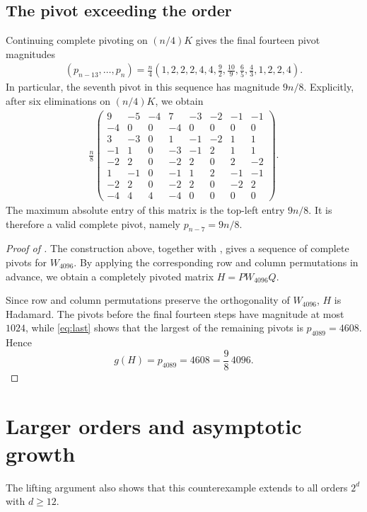 \documentclass{article}
\begin{document}
\subsection{The pivot exceeding the order}\label{sec:large-pivot}
Continuing complete pivoting on $(n/4)K$ gives the final fourteen pivot magnitudes
\begin{align}\label{eq:last}
    (p_{n-13},\ldots,p_n)
    =\frac n4\left(1,2,2,2,4,4,\frac92,\frac{10}{9},
        \frac65,\frac43,1,2,2,4\right).
\end{align}
In particular, the seventh pivot in this sequence has magnitude $9n/8$.
Explicitly, after six
eliminations on $(n/4)K$, we obtain
\begin{align*}
\frac n8
\begin{pmatrix}
 9&-5&-4&7&-3&-2&-1&-1\\
 -4&0&0&-4&0&0&0&0\\
 3&-3&0&1&-1&-2&1&1\\
 -1&1&0&-3&-1&2&1&1\\
 -2&2&0&-2&2&0&2&-2\\
 1&-1&0&-1&1&2&-1&-1\\
 -2&2&0&-2&2&0&-2&2\\
 -4&4&4&-4&0&0&0&0
\end{pmatrix}.
\end{align*}
The maximum absolute entry of this matrix is the top-left entry $9n/8$.
It is therefore a valid complete pivot, namely $p_{n-7}=9n/8$.

\begin{proof}[Proof of ]
The construction above, together with , gives
a sequence of complete pivots for $W_{4096}$.
By applying the corresponding row and column permutations in advance, we obtain a completely pivoted matrix
$H=PW_{4096}Q$.

Since row and column permutations preserve the orthogonality of $W_{4096}$, $H$ is Hadamard. The pivots before the final
fourteen steps have magnitude at most $1024$, while \eqref{eq:last} shows that the largest of the remaining
pivots is $p_{4089}=4608$. Hence
\[
    g(H)=p_{4089}=4608=\frac98\,4096.
\]
\end{proof}
\section{Larger orders and asymptotic growth}\label{sec:larger-orders}

The lifting argument also shows that this counterexample extends to all orders $2^d$ with $d\ge12$.
\end{document}
